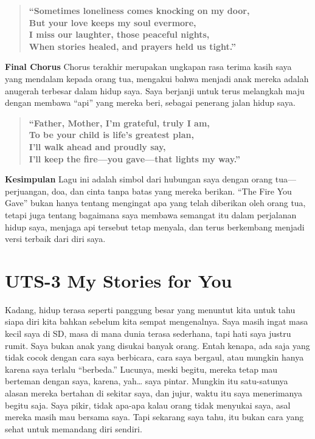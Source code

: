 \documentclass[
  letterpaper,
  DIV=11,
  numbers=noendperiod]{scrreprt}
\begin{document}
\begin{quote}
\textbf{``Sometimes loneliness comes knocking on my door,\\
But your love keeps my soul evermore,\\
I miss our laughter, those peaceful nights,\\
When stories healed, and prayers held us tight.''}
\end{quote}

\textbf{Final Chorus} Chorus terakhir merupakan ungkapan rasa terima
kasih saya yang mendalam kepada orang tua, mengakui bahwa menjadi anak
mereka adalah anugerah terbesar dalam hidup saya. Saya berjanji untuk
terus melangkah maju dengan membawa ``api'' yang mereka beri, sebagai
penerang jalan hidup saya.

\begin{quote}
\textbf{``Father, Mother, I'm grateful, truly I am,\\
To be your child is life's greatest plan,\\
I'll walk ahead and proudly say,\\
I'll keep the fire---you gave---that lights my way.''}
\end{quote}

\textbf{Kesimpulan} Lagu ini adalah simbol dari hubungan saya dengan
orang tua---perjuangan, doa, dan cinta tanpa batas yang mereka berikan.
``The Fire You Gave'' bukan hanya tentang mengingat apa yang telah
diberikan oleh orang tua, tetapi juga tentang bagaimana saya membawa
semangat itu dalam perjalanan hidup saya, menjaga api tersebut tetap
menyala, dan terus berkembang menjadi versi terbaik dari diri saya.


\chapter{UTS-3 My Stories for You}\label{uts-3-my-stories-for-you}

Kadang, hidup terasa seperti panggung besar yang menuntut kita untuk
tahu siapa diri kita bahkan sebelum kita sempat mengenalnya. Saya masih
ingat masa kecil saya di SD, masa di mana dunia terasa sederhana, tapi
hati saya justru rumit. Saya bukan anak yang disukai banyak orang. Entah
kenapa, ada saja yang tidak cocok dengan cara saya berbicara, cara saya
bergaul, atau mungkin hanya karena saya terlalu ``berbeda.'' Lucunya,
meski begitu, mereka tetap mau berteman dengan saya, karena, yah\ldots{}
saya pintar. Mungkin itu satu-satunya alasan mereka bertahan di sekitar
saya, dan jujur, waktu itu saya menerimanya begitu saja. Saya pikir,
tidak apa-apa kalau orang tidak menyukai saya, asal mereka masih mau
bersama saya. Tapi sekarang saya tahu, itu bukan cara yang sehat untuk
memandang diri sendiri.
\end{document}

